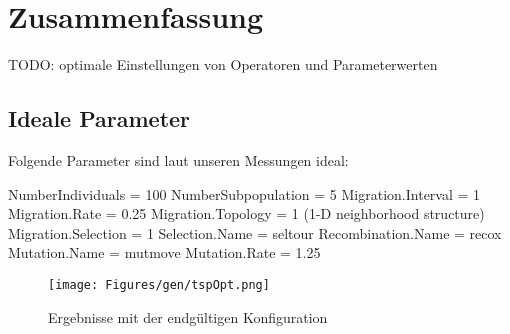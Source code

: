 \section{Zusammenfassung}\label{conclusion}

TODO: optimale Einstellungen von Operatoren und Parameterwerten

\subsection{Ideale Parameter}

Folgende Parameter sind laut unseren Messungen ideal:

NumberIndividuals = 100
NumberSubpopulation = 5
Migration.Interval = 1
Migration.Rate = 0.25
Migration.Topology = 1 (1-D neighborhood structure)
Migration.Selection = 1
Selection.Name = seltour
Recombination.Name = recox
Mutation.Name = mutmove
Mutation.Rate = 1.25



\begin{figure}[h!]
  \centering
  \texttt{[image: Figures/gen/tspOpt.png]}
  \caption{Ergebnisse mit der endgültigen Konfiguration}\label{fig.tspOpt}
\end{figure}


